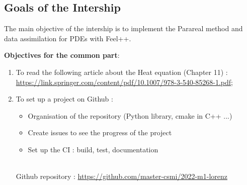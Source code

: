 \documentclass[12pt]{article}
\begin{document}
	\subsection{Goals of the Intership}
	\noindent The main objective of the intership is to implement the Parareal method and data assimilation for PDEs with Feel++. 
	\newline
	
	\noindent \textbf{Objectives for the common part}:
    	\begin{enumerate}
        \item To read the following article about the Heat equation (Chapter 11) : \\ \url{https://link.springer.com/content/pdf/10.1007/978-3-540-85268-1.pdf};
			\item To set up a project on Github :
			\begin{itemize}
				\item Organisation of the repository (Python library, cmake in C++ ...)
				\item Create issues to see the progress of the project
				\item Set up the CI : build, test, documentation 
			    \end{itemize}\; \\
		Github repository : \url{https://github.com/master-csmi/2022-m1-lorenz}
	\end{enumerate}
	
\end{document}
